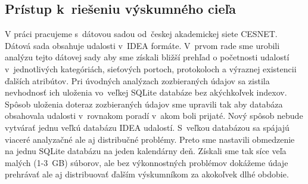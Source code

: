 \documentclass[thesismargins, thesislinespacing, openright, upjsfrontpage]{rnthesis}
\begin{document}

\subsection{Prístup k~riešeniu výskumného cieľa} \label{c1_metodologia}

V práci pracujeme s~dátovou sadou od~českej akademickej siete CESNET. Dátová sada obsahuje udalosti v~IDEA formáte. V~prvom rade sme urobili analýzu tejto dátovej sady aby sme získali bližší prehľad o početnosti udalostí v~jednotlivých kategóriách, sieťových portoch, protokoloch a výraznej existencii ďalších atribútov. Pri úvodných analýzach zozbieraných údajov sa zistila nevhodnosť ich uloženia vo~veľkej SQLite databáze bez akýchkoľvek indexov. Spôsob uloženia doteraz zozbieraných údajov sme upravili tak aby databáza obsahovala udalosti v~rovnakom poradí v~akom boli prijaté. Nový spôsob nebude vytvárať jednu veľkú databázu IDEA udalostí. S~veľkou databázou sa spájajú viaceré analyzačné ale aj distribučné problémy. Preto sme nastavili obmedzenie na jednu SQLite databázu na jeden kalendárny deň. Získali sme tak síce veľa malých (1-3~GB) súborov, ale bez výkonnostných problémov dokážeme údaje prehrávať ale aj distribuovať ďalším výskumníkom za akokoľvek dlhé obdobie. 
\end{document}
